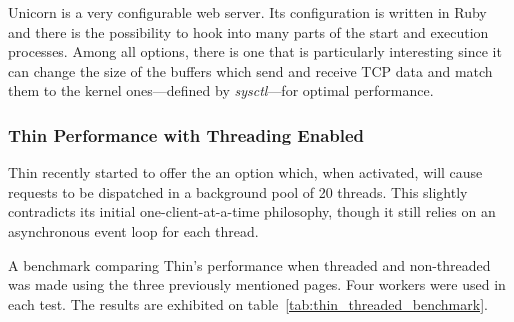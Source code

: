 Unicorn is a very configurable web server. Its configuration is written in Ruby and there is the possibility to hook into many parts of the start and execution processes. Among all options, there is one that is particularly interesting since it can change the size of the buffers which send and receive TCP data and match them to the kernel ones---defined by \textit{sysctl}---for optimal performance.

\subsubsection{Thin Performance with Threading Enabled}
Thin recently started to offer the an option which, when activated, will cause requests to be dispatched in a background pool of 20 threads. This slightly contradicts its initial one-client-at-a-time philosophy, though it still relies on an asynchronous event loop for each thread.

A benchmark comparing Thin's performance when threaded and non-threaded was made using the three previously mentioned pages. Four workers were used in each test. The results are exhibited on table~\ref{tab:thin_threaded_benchmark}.

